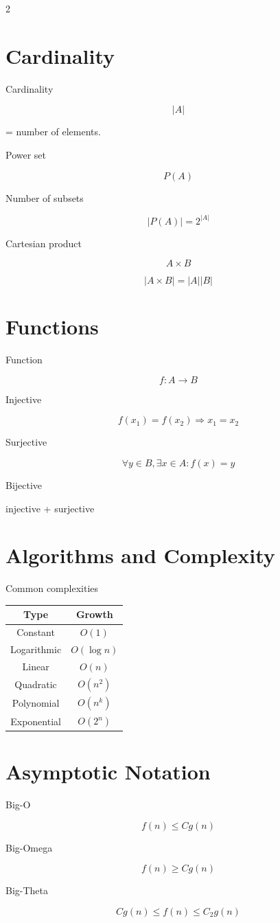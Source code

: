\documentclass[9pt]{article}
\begin{document}
\begin{multicols}{2}
\section*{Cardinality}

Cardinality

\[
|A|
\]

= number of elements.

Power set

\[
P(A)
\]

Number of subsets

\[
|P(A)|=2^{|A|}
\]

Cartesian product

\[
A\times B
\]

\[
|A\times B|=|A||B|
\]

\section*{Functions}

Function

\[
f:A\rightarrow B
\]

Injective

\[
f(x_1)=f(x_2)\Rightarrow x_1=x_2
\]

Surjective

\[
\forall y\in B,\exists x\in A:f(x)=y
\]

Bijective

injective + surjective

\section*{Algorithms and Complexity}

Common complexities

\begin{tabular}{c|c}
Type & Growth\\
\hline
Constant & $O(1)$\\
Logarithmic & $O(\log n)$\\
Linear & $O(n)$\\
Quadratic & $O(n^2)$\\
Polynomial & $O(n^k)$\\
Exponential & $O(2^n)$
\end{tabular}

\section*{Asymptotic Notation}

Big-O

\[
f(n)\le Cg(n)
\]

Big-Omega

\[
f(n)\ge Cg(n)
\]

Big-Theta

\[
Cg(n)\le f(n)\le C_2g(n)
\]


\end{multicols}
\end{document}
